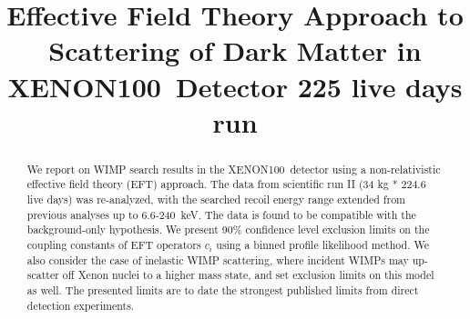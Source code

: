 \documentclass[twocolumn, showpacs, showkeys, amsmath, amssymb, amsfonts, floatfix, linenumbers]{revtex4-1}
\newcommand{\Xehund}{{XENON100}}
\begin{document}

\title{Effective Field Theory Approach to Scattering of Dark Matter in  \Xehund\ Detector 225 live days run}
%


\begin{abstract} 

We report on WIMP search results in the \Xehund\ detector using a non-relativistic effective field theory (EFT) approach.  The data from scientific run II (34 kg * 224.6 live days) was re-analyzed, with the searched recoil energy range extended from previous analyses up to 6.6-240~keV. The data is found to be compatible with the background-only hypothesis. We present 90\% confidence level exclusion limits on the coupling constants of EFT operators $c_i$ using a binned profile likelihood method. We also consider the case of inelastic WIMP scattering, where incident WIMPs may up-scatter off Xenon nuclei to a higher mass state, and set exclusion limits on this model as well. The presented limits are to date the strongest published limits from direct detection experiments. 
\end{abstract}

\pacs{}

\maketitle 













\appendix

\end{document}

